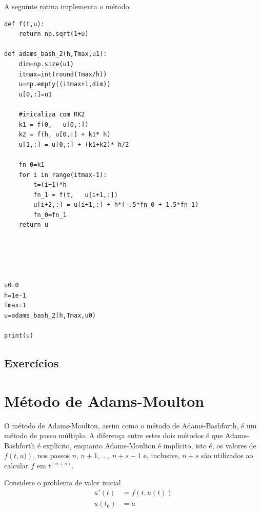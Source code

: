 \ifispython
A seguinte rotina implementa o método:
\begin{verbatim}
def f(t,u):
	return np.sqrt(1+u)

def adams_bash_2(h,Tmax,u1):
	dim=np.size(u1)
	itmax=int(round(Tmax/h))
	u=np.empty((itmax+1,dim))
	u[0,:]=u1

	#inicaliza com RK2
	k1 = f(0,   u[0,:])
	k2 = f(h, u[0,:] + k1* h)
	u[1,:] = u[0,:] + (k1+k2)* h/2

	fn_0=k1
	for i in range(itmax-1):
		t=(i+1)*h
		fn_1 = f(t,   u[i+1,:])
		u[i+2,:] = u[i+1,:] + h*(-.5*fn_0 + 1.5*fn_1)
		fn_0=fn_1
	return u





u0=0
h=1e-1
Tmax=1
u=adams_bash_2(h,Tmax,u0)

print(u)
\end{verbatim}
\fi

\emconstrucao

\subsection*{Exercícios}

\emconstrucao

\section{Método de Adams-Moulton}\label{sec:Adams_Moulton}
O método de Adams-Moulton, assim como o método de Adams-Bashforth, é um método de passo múltiplo. A diferença entre estes dois métodos é que Adams-Bashforth é explícito, enquanto Adams-Moulton é implícito, isto é, os valores de $f\left(t,u)\right)$, nos passos $n$, $n+1$, ..., $n+s-1$ e, inclusive, $n+s$ são utilizados ao calcular $f$ em $t^{(n+s)}$.

Considere o problema de valor inicial
\begin{eqnarray}
  u'(t) &= f(t,u(t)) \\
  u(t_0) &= a
\end{eqnarray}

